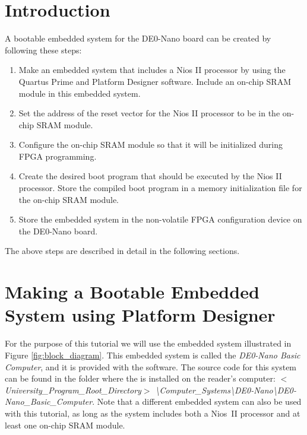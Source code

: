 \documentclass[11pt, twoside, pdftex]{article}
\begin{document}
\section{Introduction}

A bootable embedded system for the DE0-Nano board can be created by following these steps:

\begin{enumerate}
\item Make an embedded system that includes a Nios II processor by using the Quartus Prime 
and Platform Designer software. Include an on-chip SRAM module in this embedded system. 

\item Set the address of the reset vector for the Nios II processor to be 
in the on-chip SRAM module.

\item Configure the on-chip SRAM module so that it will be initialized during FPGA programming.

\item Create the desired boot program that should be executed by the Nios II processor.  
Store the compiled boot program in a memory initialization file for the on-chip SRAM module.

\item Store the embedded system in the non-volatile FPGA configuration device on 
the DE0-Nano board.
\end{enumerate}

The above steps are described in detail in the following sections. 

\section{Making a Bootable Embedded System using Platform Designer}

For the purpose of this tutorial we will use the embedded system illustrated in
Figure \ref{fig:block_diagram}. This embedded system is called the {\it DE0-Nano Basic Computer},
and it is provided with the \productNameMed{} software. The source code for this system can
be found in the folder where the \productNameMed{} is installed on the reader's
computer: {\it$<$University\_Program\_Root\_Directory$>$ \textbackslash Computer\_Systems\textbackslash DE0-Nano\textbackslash DE0-Nano\_Basic\_Computer}. Note that a different embedded system can also be used with this tutorial, as
long as the system includes both a Nios~II processor and at least one on-chip SRAM module.
\end{document}
